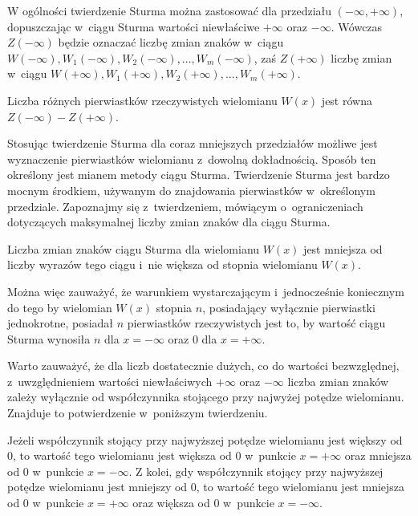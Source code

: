 W ogólności twierdzenie Sturma można zastosować dla przedziału $(-\infty,+\infty)$, dopuszczając w~ciągu Sturma wartości niewłaściwe $+\infty$ oraz $-\infty$. Wówczas $Z(-\infty)$ będzie oznaczać liczbę zmian znaków w~ciągu $W(-\infty), W_1(-\infty), W_2(-\infty),..., W_m(-\infty)$, zaś $Z(+\infty)$ liczbę zmian w~ciągu $W(+\infty), W_1(+\infty), W_2(+\infty),..., W_m(+\infty)$.

\begin{theorem}
	$ $ \\
	Liczba różnych pierwiastków rzeczywistych wielomianu $W(x)$ jest równa $Z(-\infty)-Z(+\infty)$.
\end{theorem}

Stosując twierdzenie Sturma dla coraz mniejszych przedziałów możliwe jest wyznaczenie pierwiastków wielomianu z~dowolną dokładnością. Sposób ten określony jest mianem metody ciągu Sturma.
Twierdzenie Sturma jest bardzo mocnym środkiem, używanym do znajdowania pierwiastków w~określonym przedziale. Zapoznajmy się z~twierdzeniem, mówiącym o~ograniczeniach dotyczących maksymalnej liczby zmian znaków dla ciągu Sturma.

\begin{theorem}
	$ $ \\
	Liczba zmian znaków ciągu Sturma dla wielomianu $W(x)$ jest mniejsza od liczby wyrazów tego ciągu i~nie większa od stopnia wielomianu $W(x)$.
\end{theorem}

Można więc zauważyć, że warunkiem wystarczającym i~jednocześnie koniecznym do tego by wielomian $W(x)$ stopnia $n$, posiadający wyłącznie pierwiastki jednokrotne, posiadał $n$ pierwiastków rzeczywistych jest to, by wartość ciągu Sturma wynosiła $n$ dla $x=-\infty$ oraz $0$ dla $x=+\infty$. 

Warto zauważyć, że dla liczb dostatecznie dużych, co do wartości bezwzględnej, z~uwzględnieniem wartości niewłaściwych $+\infty$ oraz $-\infty$ liczba zmian znaków zależy wyłącznie od współczynnika stojącego przy najwyżej potędze wielomianu. Znajduje to potwierdzenie w~poniższym twierdzeniu.

\begin{theorem}
	$ $ \\
	Jeżeli współczynnik stojący przy najwyższej potędze wielomianu jest większy od $0$, to wartość tego wielomianu jest większa od $0$ w~punkcie $x=+\infty$ oraz mniejsza od $0$ w~punkcie $x=-\infty$.
	Z kolei, gdy współczynnik stojący przy najwyższej potędze wielomianu jest mniejszy od $0$, to wartość tego wielomianu jest mniejsza od $0$ w~punkcie $x=+\infty$ oraz większa od $0$ w~punkcie $x=-\infty$.
\end{theorem}

